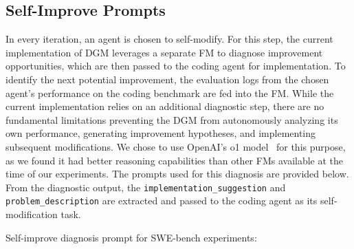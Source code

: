 \documentclass{article} %
\begin{document}
\subsection{Self-Improve Prompts}
\label{app:selfimprove-prompts}

In every iteration, an agent is chosen to self-modify. For this step, the current implementation of DGM leverages a separate FM to diagnose improvement opportunities, which are then passed to the coding agent for implementation. To identify the next potential improvement, the evaluation logs from the chosen agent's performance on the coding benchmark are fed into the FM. While the current implementation relies on an additional diagnostic step, there are no fundamental limitations preventing the DGM from autonomously analyzing its own performance, generating improvement hypotheses, and implementing subsequent modifications. We chose to use OpenAI's o1 model~\citep{openai2024o1} for this purpose, as we found it had better reasoning capabilities than other FMs available at the time of our experiments. The prompts used for this diagnosis are provided below. From the diagnostic output, the \texttt{implementation\_suggestion} and \texttt{problem\_description} are extracted and passed to the coding agent as its self-modification task.

Self-improve diagnosis prompt for SWE-bench experiments:
\end{document}
